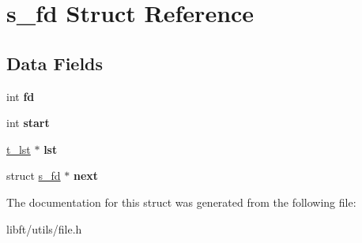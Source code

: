 \hypertarget{structs__fd}{}\section{s\+\_\+fd Struct Reference}
\label{structs__fd}
\subsection*{Data Fields}
\begin{DoxyCompactItemize}
\item 
\hypertarget{structs__fd_a6f8059414f0228f0256115e024eeed4b}{}int {\bfseries fd}\label{structs__fd_a6f8059414f0228f0256115e024eeed4b}

\item 
\hypertarget{structs__fd_a37722a150250e2a5a98e5e0d11e53449}{}int {\bfseries start}\label{structs__fd_a37722a150250e2a5a98e5e0d11e53449}

\item 
\hypertarget{structs__fd_a867b0f4cdbe08b3d475d06980a7ebe59}{}\hyperlink{structs__lst}{t\+\_\+lst} $\ast$ {\bfseries lst}\label{structs__fd_a867b0f4cdbe08b3d475d06980a7ebe59}

\item 
\hypertarget{structs__fd_af41a5951224e58111251157a20321627}{}struct \hyperlink{structs__fd}{s\+\_\+fd} $\ast$ {\bfseries next}\label{structs__fd_af41a5951224e58111251157a20321627}

\end{DoxyCompactItemize}


The documentation for this struct was generated from the following file\+:\begin{DoxyCompactItemize}
\item 
libft/utils/file.\+h\end{DoxyCompactItemize}
